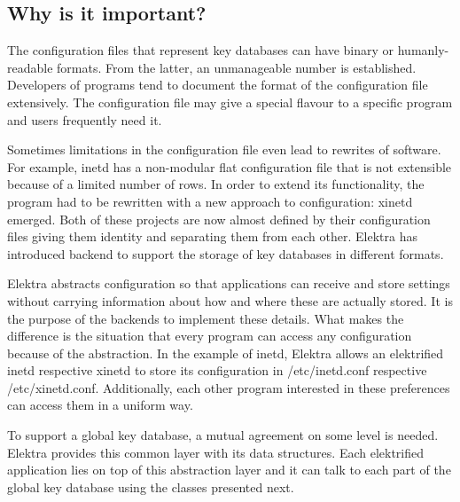 \subsection*{Why is it important?}

The configuration files that represent key databases can have binary or humanly-\/readable formats. From the latter, an unmanageable number is established. Developers of programs tend to document the format of the configuration file extensively. The configuration file may give a special flavour to a specific program and users frequently need it.

Sometimes limitations in the configuration file even lead to rewrites of software. For example, inetd has a non-\/modular flat configuration file that is not extensible because of a limited number of rows. In order to extend its functionality, the program had to be rewritten with a new approach to configuration\+: xinetd emerged. Both of these projects are now almost defined by their configuration files giving them identity and separating them from each other. Elektra has introduced backend to support the storage of key databases in different formats.

Elektra abstracts configuration so that applications can receive and store settings without carrying information about how and where these are actually stored. It is the purpose of the backends to implement these details. What makes the difference is the situation that every program can access any configuration because of the abstraction. In the example of inetd, Elektra allows an elektrified inetd respective xinetd to store its configuration in /etc/inetd.conf respective /etc/xinetd.conf. Additionally, each other program interested in these preferences can access them in a uniform way.

To support a global key database, a mutual agreement on some level is needed. Elektra provides this common layer with its data structures. Each elektrified application lies on top of this abstraction layer and it can talk to each part of the global key database using the classes presented next. 
